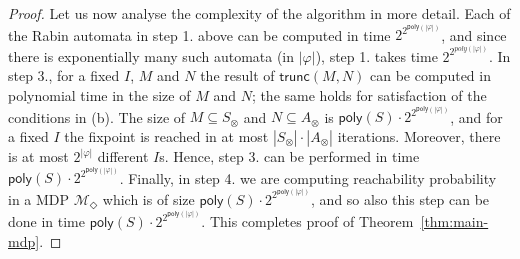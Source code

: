\documentclass[a4paper,UKenglish]{lipics}
\newcommand{\poly}[1]{\mathsf{poly}(#1)}
\newcommand{\mdp}{\mathcal{M}}
\newcommand{\trunc}[1]{\mathsf{trunc}(#1)}
\begin{document}
\begin{proof}
	\noindent
	
	Let us now analyse the complexity of the algorithm in more detail. Each of the Rabin automata in step 1. above can be computed in time $2^{2^{\poly{|\varphi|}}}$,
	and since there is exponentially many such automata (in $|\varphi|$), step 1. takes time $2^{2^{poly(|\varphi|)}}$.
	In step 3., for a fixed $I$, $M$ and $N$ the result of $\trunc{M,N}$ can be computed in polynomial time in the size of $M$ and $N$; the same holds 	for satisfaction of the conditions in (b).
The size of $M\subseteq S_\otimes$ and
	$N\subseteq A_\otimes$ is
	$\poly{S}\cdot 2^{2^{\poly{|\varphi|}}}$, and for a fixed $I$ the fixpoint is reached in at most $|S_\otimes| \cdot |A_\otimes|$ iterations.
	Moreover, there is
	at most $2^{|\varphi|}$ different $I$s. Hence, step 3. can be performed in time $\poly{S}\cdot 2^{2^{\poly{|\varphi|}}}$.
	Finally, in step 4. we are computing reachability probability in a MDP $\mdp_\Diamond$ which is of size $\poly{S} \cdot 2^{2^{\poly{|\varphi|}}}$,
	and so also this step can be done in time $\poly{S}\cdot 2^{2^{\poly{|\varphi|}}}$.
	This completes proof of Theorem~\ref{thm:main-mdp}.
\end{proof}
 
\end{document}

